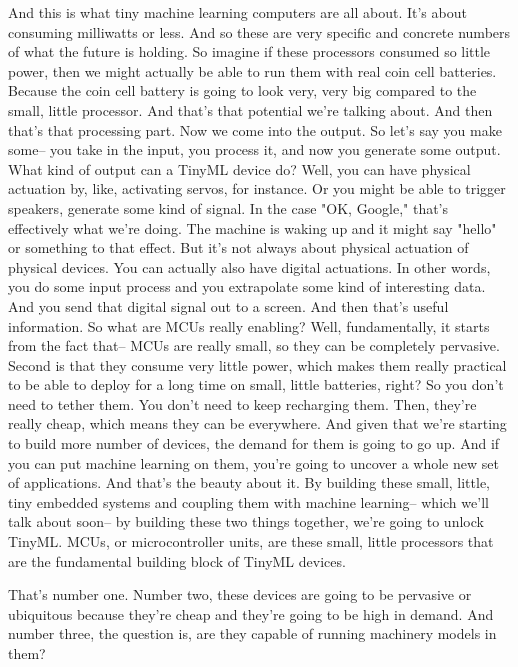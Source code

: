 And this is what tiny machine learning computers are all about.
It's about consuming milliwatts or less.
And so these are very specific and concrete numbers
of what the future is holding.
So imagine if these processors consumed so little power, then we might actually be able to run them with real coin cell batteries.
Because the coin cell battery is going to look very, very big compared to the small, little processor.
And that's that potential we're talking about.
And then that's that processing part.
Now we come into the output.
So let's say you make some-- you take in the input, you process it, and now you generate some output.
What kind of output can a TinyML device do?
Well, you can have physical actuation by, like, activating servos, for instance.
Or you might be able to trigger speakers, generate some kind of signal.
In the case "OK, Google," that's effectively what we're doing.
The machine is waking up and it might say "hello" or something to that effect.
But it's not always about physical actuation of physical devices.
You can actually also have digital actuations.
In other words, you do some input process and you extrapolate some kind of interesting data.
And you send that digital signal out to a screen.
And then that's useful information.
So what are MCUs really enabling?
Well, fundamentally, it starts from the fact that-- MCUs are really small, so they can be completely pervasive.
Second is that they consume very little power, which makes them really practical to be able to deploy for a long time on small, little batteries, right?
So you don't need to tether them. You don't need to keep recharging them.
Then, they're really cheap, which means they can be everywhere.
And given that we're starting to build more number of devices, the demand for them is going to go up.
And if you can put machine learning on them, you're going to uncover a whole new set of applications.
And that's the beauty about it.
By building these small, little, tiny embedded systems and coupling them with machine learning-- which we'll talk about soon-- by building these two things together, we're going to unlock TinyML.
MCUs, or microcontroller units, are these small, little processors that are the fundamental building block of TinyML devices.

That's number one.
Number two, these devices are going to be pervasive or ubiquitous because they're cheap and they're going to be high in demand.
And number three, the question is, are they capable of running machinery models in them?





